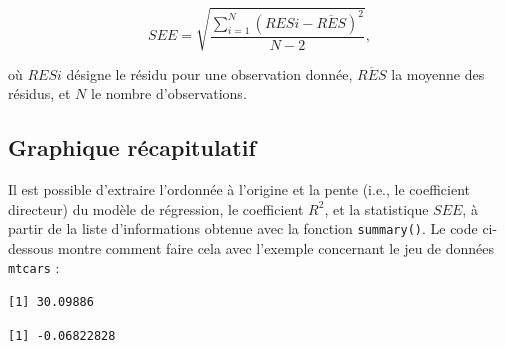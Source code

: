 \documentclass[
  letterpaper,
]{book}
\newenvironment{Shaded}{\begin{snugshade}}{\end{snugshade}}
\newcommand{\CommentTok}[1]{\textcolor[rgb]{0.37,0.37,0.37}{#1}}
\newcommand{\DecValTok}[1]{\textcolor[rgb]{0.68,0.00,0.00}{#1}}
\newcommand{\FunctionTok}[1]{\textcolor[rgb]{0.28,0.35,0.67}{#1}}
\newcommand{\NormalTok}[1]{\textcolor[rgb]{0.00,0.23,0.31}{#1}}
\newcommand{\OtherTok}[1]{\textcolor[rgb]{0.00,0.23,0.31}{#1}}
\newcommand{\SpecialCharTok}[1]{\textcolor[rgb]{0.37,0.37,0.37}{#1}}
\begin{document}
\[ SEE = \sqrt{\frac{\sum_{i=1}^{N}(RES{i} - \overline{RES})^2}{N-2}}, \]

où \(RES{i}\) désigne le résidu pour une observation donnée,
\(\overline{RES}\) la moyenne des résidus, et \(N\) le nombre
d'observations.

\subsection{Graphique récapitulatif}\label{graphique-ruxe9capitulatif}

Il est possible d'extraire l'ordonnée à l'origine et la pente (i.e., le
coefficient directeur) du modèle de régression, le coefficient \(R^2\),
et la statistique \(SEE\), à partir de la liste d'informations obtenue
avec la fonction \texttt{summary()}. Le code ci-dessous montre comment
faire cela avec l'exemple concernant le jeu de données \texttt{mtcars} :

\begin{Shaded}
\end{Shaded}

\begin{verbatim}
[1] 30.09886
\end{verbatim}

\begin{Shaded}
\end{Shaded}

\begin{verbatim}
[1] -0.06822828
\end{verbatim}

\begin{Shaded}
\end{Shaded}
\end{document}

